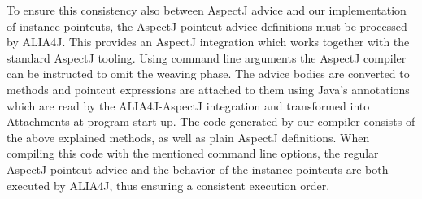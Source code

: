 \documentclass{acm_proc_article-sp}
\begin{document}
To ensure this consistency also between AspectJ advice and our implementation of instance pointcuts, the AspectJ point\-cut-advice definitions must be processed by ALIA4J.
This provides an AspectJ integration which works together with the standard AspectJ tooling.
Using command line arguments the AspectJ compiler can be instructed to omit the weaving phase.
The advice bodies are converted to methods and pointcut expressions are attached to them using Java's annotations which are read by the ALIA4J-AspectJ integration and transformed into Attachments at program start-up.
The code generated by our compiler consists of the above explained methods, as well as plain AspectJ definitions.
When compiling this code with the mentioned command line options, the regular AspectJ pointcut-advice and the behavior of the instance pointcuts are both executed by ALIA4J, thus ensuring a consistent execution order.
\end{document}
